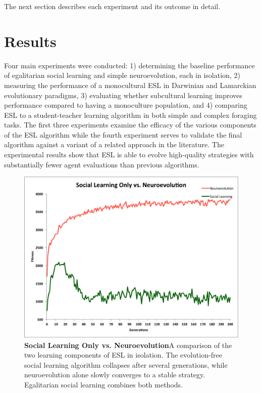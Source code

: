 \documentclass{sig-alternate}
\begin{document}
The next section describes each experiment and its outcome in detail.


\section{Results}
\label{sec:results}
Four main experiments were conducted: 1) determining the baseline performance of egalitarian social learning and simple neuroevolution, each in isolation, 2) measuring the performance of a monocultural ESL in Darwinian and Lamarckian evolutionary paradigms, 3) evaluating whether subcultural learning improves performance compared to having a monoculture population, and 4) comparing ESL to a student-teacher learning algorithm in both simple and complex foraging tasks. The first three experiments examine the efficacy of the various components of the ESL algorithm while the fourth experiment serves to validate the final algorithm against a variant of a related approach in the literature. The experimental results show that ESL is able to evolve high-quality strategies with substantially fewer agent evaluations than previous algorithms.


\begin{figure}
  \centering
    \includegraphics[scale=.41]{social_learning_vs_neuroevolution.pdf}
  \caption{\textbf{Social Learning Only vs. Neuroevolution}A comparison of the two learning components of ESL in isolation.  The evolution-free social learning algorithm collapses after several generations, while neuroevolution alone slowly converges to a stable strategy.  Egalitarian social learning combines both methods.}
  \label{fig:social-neuro}
\end{figure}
\end{document}
